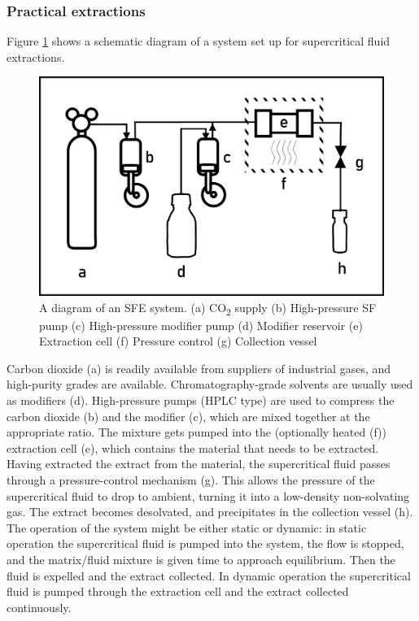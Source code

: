 \subsubsection{Practical extractions}

Figure \ref{fig:sfediagram} shows a schematic diagram of a system set up for
supercritical fluid extractions.

\begin{figure}
\centering
\includegraphics[width=\textwidth]{Figures/SFE_System}
\decoRule

\caption[SFE system diagram]{A diagram of an SFE system. (a) CO\textsubscript{2} supply (b)
High-pressure SF pump (c) High-pressure modifier pump (d) Modifier reservoir (e)
Extraction cell (f) Pressure control (g) Collection vessel}

\label{fig:sfediagram}
\end{figure}

Carbon dioxide (a) is readily available from suppliers of industrial gases, and
high-purity grades are available. Chromatography-grade solvents are usually used
as modifiers (d). High-pressure pumps (HPLC type) are used to compress the
carbon dioxide (b) and the modifier (c), which are mixed together at the
appropriate ratio. The mixture gets pumped into the (optionally heated (f))
extraction cell (e), which contains the material that needs to be extracted.
Having extracted the extract from the material, the supercritical fluid passes
through a pressure-control mechanism (g). This allows the pressure of the
supercritical fluid to drop to ambient, turning it into a low-density
non-solvating gas. The extract becomes desolvated, and precipitates in the
collection vessel (h). The operation of the system might be either static or
dynamic: in static operation the supercritical fluid is pumped into the system,
the flow is stopped, and the matrix/fluid mixture is given time to approach
equilibrium. Then the fluid is expelled and the extract collected.
In dynamic operation the supercritical fluid is pumped through the extraction
cell and the extract collected continuously. 


